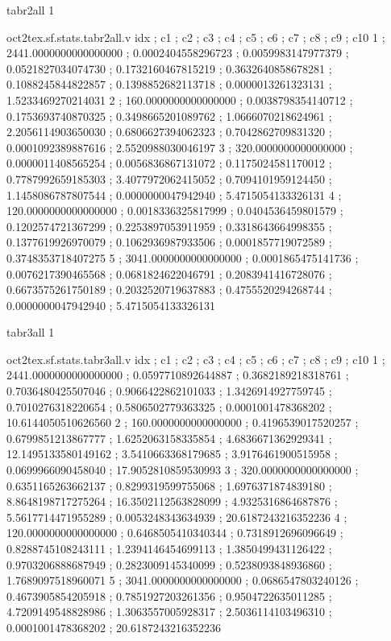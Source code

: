 \expandafter\def\csname oct2tex.sf.stats.tabr2all.t\endcsname{tabr2all}
\expandafter\def\csname oct2tex.sf.stats.tabr2all.u\endcsname{1}
\begin{filecontents}[overwrite]{oct2tex.sf.stats.tabr2all.v}
idx ; c1 ; c2 ; c3 ; c4 ; c5 ; c6 ; c7 ; c8 ; c9 ; c10
1 ; 2441.0000000000000000 ; 0.0002404558296723 ; 0.0059983147977379 ; 0.0521827034074730 ; 0.1732160467815219 ; 0.3632640858678281 ; 0.1088245844822857 ; 0.1398852682113718 ; 0.0000013261323131 ; 1.5233469270214031
2 ; 160.0000000000000000 ; 0.0038798354140712 ; 0.1753693740870325 ; 0.3498665201089762 ; 1.0666070218624961 ; 2.2056114903650030 ; 0.6806627394062323 ; 0.7042862709831320 ; 0.0001092389887616 ; 2.5520988030046197
3 ; 320.0000000000000000 ; 0.0000011408565254 ; 0.0056836867131072 ; 0.1175024581170012 ; 0.7787992659185303 ; 3.4077972062415052 ; 0.7094101959124450 ; 1.1458086787807544 ; 0.0000000047942940 ; 5.4715054133326131
4 ; 120.0000000000000000 ; 0.0018336325817999 ; 0.0404536459801579 ; 0.1202574721367299 ; 0.2253897053911959 ; 0.3318643664998355 ; 0.1377619926970079 ; 0.1062936987933506 ; 0.0001857719072589 ; 0.3748353718407275
5 ; 3041.0000000000000000 ; 0.0001865475141736 ; 0.0076217390465568 ; 0.0681824622046791 ; 0.2083941416728076 ; 0.6673575261750189 ; 0.2032520719637883 ; 0.4755520294268744 ; 0.0000000047942940 ; 5.4715054133326131
\end{filecontents}
\expandafter\def\csname oct2tex.sf.stats.tabr3all.t\endcsname{tabr3all}
\expandafter\def\csname oct2tex.sf.stats.tabr3all.u\endcsname{1}
\begin{filecontents}[overwrite]{oct2tex.sf.stats.tabr3all.v}
idx ; c1 ; c2 ; c3 ; c4 ; c5 ; c6 ; c7 ; c8 ; c9 ; c10
1 ; 2441.0000000000000000 ; 0.0597710892644887 ; 0.3682189218318761 ; 0.7036480425507046 ; 0.9066422862101033 ; 1.3426914927759745 ; 0.7010276318220654 ; 0.5806502779363325 ; 0.0001001478368202 ; 10.6144050510626560
2 ; 160.0000000000000000 ; 0.4196539017520257 ; 0.6799851213867777 ; 1.6252063158335854 ; 4.6836671362929341 ; 12.1495133580149162 ; 3.5410663368179685 ; 3.9176461900515958 ; 0.0699966090458040 ; 17.9052810859530993
3 ; 320.0000000000000000 ; 0.6351165263662137 ; 0.8299319599755068 ; 1.6976371874839180 ; 8.8648198717275264 ; 16.3502112563828099 ; 4.9325316864687876 ; 5.5617714471955289 ; 0.0053248343634939 ; 20.6187243216352236
4 ; 120.0000000000000000 ; 0.6468505410340344 ; 0.7318912696096649 ; 0.8288745108243111 ; 1.2394146454699113 ; 1.3850499431126422 ; 0.9703206888687949 ; 0.2823009145340099 ; 0.5238093848936860 ; 1.7689097518960071
5 ; 3041.0000000000000000 ; 0.0686547803240126 ; 0.4673905854205918 ; 0.7851927203261356 ; 0.9504722635011285 ; 4.7209149548828986 ; 1.3063557005928317 ; 2.5036114103496310 ; 0.0001001478368202 ; 20.6187243216352236
\end{filecontents}
